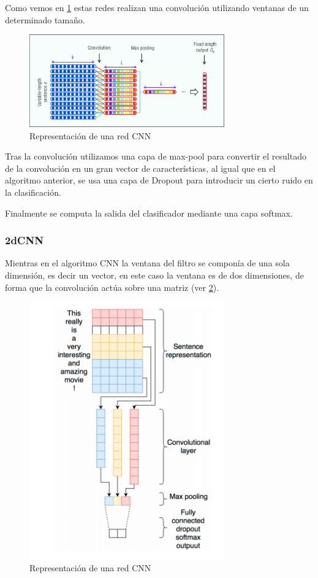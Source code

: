 Como vemos en \ref{cnn} estas redes realizan una convolución utilizando ventanas de un determinado tamaño.

\begin{figure}[!ht]
	\centering
	\includegraphics[width=0.75\textwidth]{imaxes/cnn1.png}
	\caption{Representación de una red CNN}
	\label{cnn}
\end{figure}

Tras la convolución utilizamos una capa de max-pool para convertir el resultado de la convolución en un gran vector de características, al igual que en el algoritmo anterior, se usa una capa de Dropout para introducir un cierto ruido en la clasificación.

Finalmente se computa la salida del clasificador mediante una capa softmax.

\subsubsection{2dCNN}

Mientras en el algoritmo CNN la ventana del filtro se componía de una sola dimensión, es decir un vector, en este caso la ventana es de dos dimensiones, de forma que la convolución actúa sobre una matriz (ver \ref{2cnn}).

\begin{figure}[!ht]
	\centering
	\includegraphics[width=0.75\textwidth]{imaxes/cnn.png}
	\caption{Representación de una red CNN}
	\label{2cnn}
\end{figure}


